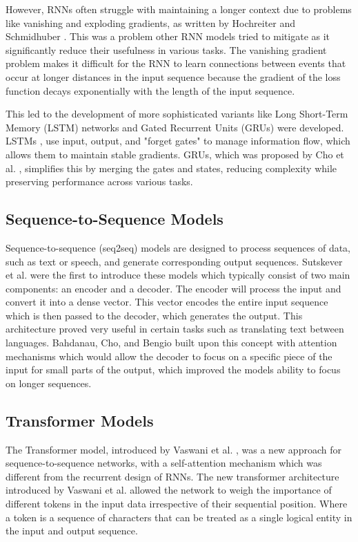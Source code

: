 However, RNNs often struggle with maintaining a longer context due to problems like vanishing and exploding gradients, as written by Hochreiter and Schmidhuber \cite{hochreiter_long_1997}. This was a problem other RNN models tried to mitigate as it significantly reduce their usefulness in various tasks. The vanishing gradient problem makes it difficult for the RNN to learn connections between events that occur at longer distances in the input sequence because the gradient of the loss function decays exponentially with the length of the input sequence.


This led to the development of more sophisticated variants like Long Short-Term Memory (LSTM) networks and Gated Recurrent Units (GRUs) were developed. LSTMs \cite{hochreiter_long_1997}, use input, output, and "forget gates" to manage information flow, which allows them to maintain stable gradients. GRUs, which was proposed by Cho et al. \cite{cho_learning_2014}, simplifies this by merging the gates and states, reducing complexity while preserving performance across various tasks.


\subsection{Sequence-to-Sequence Models}


Sequence-to-sequence (seq2seq) models are designed to process sequences of data, such as text or speech, and generate corresponding output sequences. Sutskever et al. \cite{sutskever_sequence_2014} were the first to introduce these models which typically consist of two main components: an encoder and a decoder. The encoder will process the input and convert it into a dense vector. This vector encodes the entire input sequence which is then passed to the decoder, which generates the output. This architecture proved very useful in certain tasks such as translating text between languages. Bahdanau, Cho, and Bengio built upon this concept with attention mechanisms \cite{bahdanau_neural_2016} which would allow the decoder to focus on a specific piece of the input for small parts of the output, which improved the models ability to focus on longer sequences.


\subsection{Transformer Models}


The Transformer model, introduced by Vaswani et al. \cite{vaswani_attention_2023}, was a new approach for sequence-to-sequence networks, with a self-attention mechanism which was different from the recurrent design of RNNs. The new transformer architecture introduced by Vaswani et al. allowed the network to weigh the importance of different tokens in the input data irrespective of their sequential position. Where a token is a sequence of characters that can be treated as a single logical entity in the input and output sequence.


